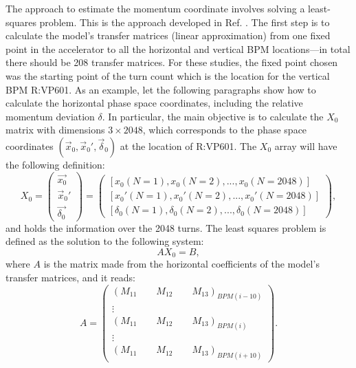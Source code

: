 The approach to estimate the momentum coordinate involves solving a least-squares problem. This is the approach developed in Ref. \cite{yang}. The first step is to calculate the model's transfer matrices (linear approximation) from one fixed point in the accelerator to all the horizontal and vertical BPM locations---in total there should be 208 transfer matrices. For these studies, the fixed point chosen was the starting point of the turn count which is the location for the vertical BPM R:VP601. As an example, let the following paragraphs show how to calculate the horizontal phase space coordinates, including the relative momentum deviation $\delta$. In particular, the main objective is to calculate the $X_0$ matrix with dimensions $3\times2048$, which corresponds to the phase space coordinates $\left( \vec{x}_0, \vec{x}_0', \vec{\delta}_0 \right)$ at the location of R:VP601. The $X_0$ array will have the following definition:
\begin{equation}
    \label{eq:x0vec}
    X_0= 
    \begin{pmatrix}
        \vec{x_0} \\
        \vec{x}_0' \\
        \vec{\delta_0}
    \end{pmatrix} = 
    \begin{pmatrix}
        \left[ x_0(N=1), x_0(N=2), ...,x_0(N=2048) \right] \\
        \left[ x_0'(N=1), x_0'(N=2), ..., x_0'(N=2048) \right] \\
        \left[ \delta_0 (N=1), \delta_0 (N=2), ..., \delta_0 (N=2048) \right]
    \end{pmatrix},
\end{equation}  
and holds the information over the 2048 turns. The least squares problem is defined as the solution to the following system:
\begin{equation}
    \label{eq:lsq}
    A X_0 = B,
\end{equation}
where $A$ is the matrix made from the horizontal coefficients of the model's transfer matrices, and it reads: 
\begin{equation}
\label{eq:alsq}
    A =
    \begin{pmatrix}
    \left( M_{11} \qquad M_{12} \qquad M_{13} \right)_{BPM(i-10)} \\
    \vdots \\
    \left( M_{11} \qquad M_{12} \qquad M_{13} \right)_{BPM(i)}  \\
    \vdots \\
    \left( M_{11} \qquad M_{12} \qquad M_{13} \right)_{BPM(i+10)} 
    \end{pmatrix}.
\end{equation}
